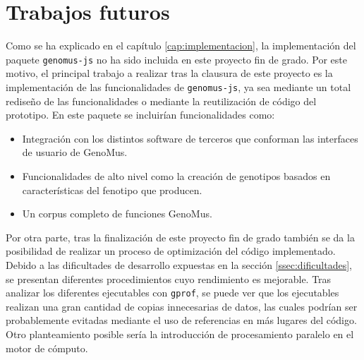 \chapter{Trabajos futuros}


Como se ha explicado en el capítulo \ref{cap:implementacion}, la implementación del paquete \verb|genomus-js| no ha sido incluida en este proyecto fin de grado. Por este motivo, el principal trabajo a realizar tras la clausura de este proyecto es la implementación de las funcionalidades de \verb|genomus-js|, ya sea mediante un total rediseño de las funcionalidades o mediante la reutilización de código del prototipo. En este paquete se incluirían funcionalidades como:

\begin{itemize}
    \item Integración con los distintos software de terceros que conforman las interfaces de usuario de GenoMus.
    \item Funcionalidades de alto nivel como la creación de genotipos basados en características del fenotipo que producen.
    \item Un corpus completo de funciones GenoMus.
\end{itemize}

Por otra parte, tras la finalización de este proyecto fin de grado también se da la posibilidad de realizar un proceso de optimización del código implementado. Debido a las dificultades de desarrollo expuestas en la sección \ref{ssec:dificultades}, se presentan diferentes procedimientos cuyo rendimiento es mejorable. Tras analizar los diferentes ejecutables con \verb|gprof|, se puede ver que los ejecutables realizan una gran cantidad de copias innecesarias de datos, las cuales podrían ser probablemente evitadas mediante el uso de referencias en más lugares del código. Otro planteamiento posible sería la introducción de procesamiento paralelo en el motor de cómputo.